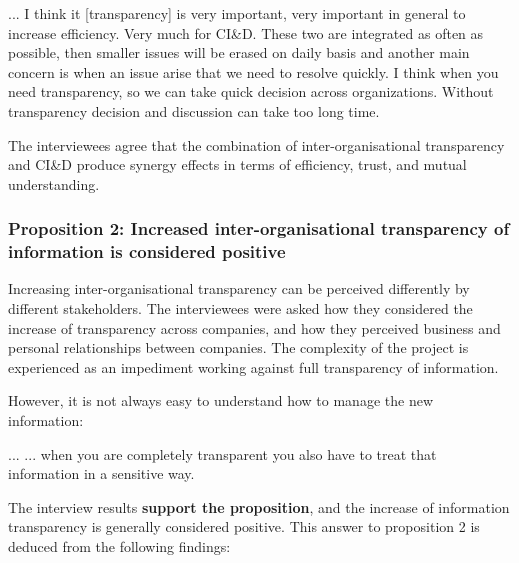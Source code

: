 \begin{aquote}{...}
I think it [transparency] is very important, very important in general to increase efficiency. Very much for CI\&D. These two are integrated as often as possible, then smaller issues will be erased on daily basis and another main concern is when an issue arise that we need to resolve quickly. I think when you need transparency, so we can take quick decision across organizations. Without transparency decision and discussion can take too long time.
\end{aquote}

 The interviewees agree that the combination of inter-organisational transparency and CI\&D produce synergy effects in terms of efficiency, trust, and mutual understanding.

\vspace{.2cm}
\subsubsection{Proposition 2: Increased inter-organisational transparency of information is considered positive}

Increasing inter-organisational transparency can be perceived differently by different stakeholders. The interviewees were asked how they considered the increase of transparency across companies, and how they perceived business and personal relationships between companies. The complexity of the project is experienced as an impediment working against full transparency of information.

However, it is not always easy to understand how to manage the new information:

\begin{aquote}{...}
... when you are completely transparent you also have to treat that information in a sensitive way.
\end{aquote}

The interview results {\bf support the proposition}, and the increase of information transparency is generally considered positive. This answer to proposition 2 is deduced from the following findings:

